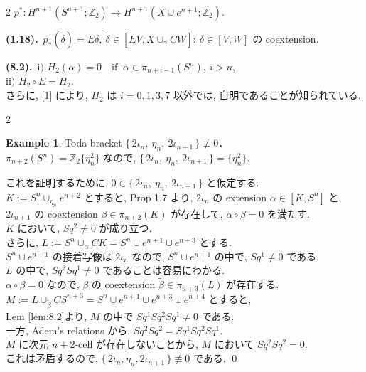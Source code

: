 \documentclass[10pt, leqno]{ltjsarticle}
\newcommand{\Ex}{E}        %
\newcommand{\toda}[1]{\{\,#1\,\}}              %
\newcommand{\gen}[1]{\{#1\}}       %
\newcommand{\pis}[2]{\pi_{#1}(#2)}       %
\newcommand{\coext}[1]{\widetilde{#1}}  %
\newcommand{\z}{\mathbb{Z}}
\newcommand{\sq}[1]{Sq^{#1}}
\numberwithin{equation}{section}
\theoremstyle{plain}
\theoremstyle{definition}
\newtheorem{example}[]{Example}
\theoremstyle{remark}
\begin{document}
\begin{paracol}{2}
\noindent
\(p^*: H^{n+1}(S^{n+1};\z_2)\to H^{n+1}(X\cup e^{n+1};\z_2)\).

\noindent
\textbf{(1.18).}\
\(p_*(\widetilde{\delta}) = E\delta,\
\widetilde{\delta}\in[EV, X\cup_\gamma CW]:\
\delta\in [V,W]\) の coextension.

\noindent
\textbf{(8.2).}\
\(\text{i) } H_2(\alpha)=0\quad \text{if }\ \alpha\in \pis{n+i-1}{S^n},\ i>n,\)\\
\(\text{ii) } H_2\circ \Ex = H_2 .\)\\
さらに, [1] により,
\(H_2\) は \(i=0,1,3,7\) 以外では, 自明であることが知られている.




\end{paracol}

\begin{paracol}{2}

\begin{example}
Toda bracket $\toda{2\iota_n,\ \eta_n,\ 2\iota_{n+1}}\not\equiv 0$．\\
$\pis{n+2}{S^n} = \z_2\gen{\eta_n^2}$ なので, 
$\toda{2\iota_n,\ \eta_n,\ 2\iota_{n+1}} = \gen{\eta_n^2}$. 
\end{example}

これを証明するために,
$0 \in \toda{2\iota_n,\ \eta_n,\ 2\iota_{n+1}}$ と仮定する.\\
\(K := S^n\cup_{\eta_n} e^{n+2}\) とすると, 
Prop 1.7 より, $2\iota_n$ の extension  $\alpha \in [K, S^n]$ と, \\
$2\iota_{n+1}$ の coextension  $\beta\in \pis{n+2}{K}$
が存在して, $\alpha\circ\beta=0$ を満たす.\\ 
$K$ において, $Sq^2\ne0$ が成り立つ. \\
さらに, $L := S^n\cup_\alpha CK = S^n\cup e^{n+1} \cup e^{n+3}$ とする.\\
\(S^n\cup e^{n+1}\) の接着写像は \(2\iota_n\) なので,
\(S^n\cup e^{n+1}\) の中で, \(\sq{1}\ne0\) である.\\
\(L\) の中で, \(\sq{2}\sq{1}\ne 0\) であることは容易にわかる.\\
\(\alpha\circ\beta = 0\) なので, 
\(\beta\) の coextension \(\coext{\beta} \in \pis{n+3}{L}\) が存在する.\\
\(
M := L\cup_{\coext{\beta}} CS^{n+3} = S^n\cup e^{n+1}\cup e^{n+3}\cup e^{n+4}
\)
とすると, \\
Lem \ref{lem:8.2}より, $M$ の中で $Sq^1 Sq^2 Sq^1 \ne 0$ である. \\
一方, Adem's relations から, $Sq^2 Sq^2 = Sq^1 Sq^2 Sq^1$.\\
$M$ に次元 $n+2$-cell が存在しないことから, 
\(M\) において $Sq^2 Sq^2 = 0$. \\
これは矛盾するので,
\(\toda{2\iota_n, \eta_n, 2\iota_{n+1}} \not\equiv 0\) である.
\qed


\end{paracol}
\end{document}
